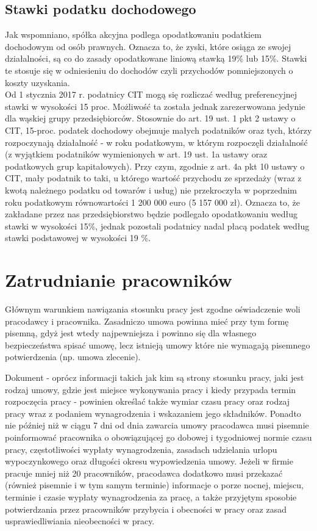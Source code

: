 \documentclass[11pt]{article}
\begin{document}
	\subsection{Stawki podatku dochodowego}
	
	Jak wspomniano, spółka akcyjna podlega opodatkowaniu podatkiem dochodowym od osób prawnych. Oznacza to, że zyski, które osiąga ze swojej działalności, są co do zasady opodatkowane liniową stawką 19\% lub 15\%. Stawki te stosuje się w odniesieniu do dochodów czyli przychodów pomniejszonych o koszty uzyskania.\\
	Od 1 stycznia 2017 r. podatnicy CIT mogą się rozliczać według preferencyjnej stawki w wysokości 15 proc. Możliwość ta została jednak zarezerwowana jedynie dla wąskiej grupy przedsiębiorców. Stosownie do art. 19 ust. 1 pkt 2 ustawy o CIT, 15-proc. podatek dochodowy obejmuje małych podatników oraz tych, którzy rozpoczynają działalność - w roku podatkowym, w którym rozpoczęli działalność (z wyjątkiem podatników wymienionych w art. 19 ust. 1a ustawy oraz podatkowych grup kapitałowych). Przy czym, zgodnie z art. 4a pkt 10 ustawy o CIT, mały podatnik to taki, u którego wartość przychodu ze sprzedaży (wraz z kwotą należnego podatku od towarów i usług) nie przekroczyła w poprzednim roku podatkowym równowartości 1 200 000 euro (5 157 000 zł). Oznacza to, że zakładane przez nas przedsiębiorstwo będzie podlegało opodatkowaniu według stawki w wysokości 15\%, jednak pozostali podatnicy nadal płacą podatek według stawki podstawowej w wysokości 19 \%.
	
	\section{Zatrudnianie pracowników}
	Głównym warunkiem nawiązania stosunku pracy jest zgodne oświadczenie woli pracodawcy i pracownika. Zasadniczo umowa powinna mieć przy tym formę pisemną, gdyż jest wtedy najpewniejsza i powinno się dla własnego bezpieczeństwa spisać umowę, lecz istnieją umowy które nie wymagają pisemnego potwierdzenia (np. umowa zlecenie).
	
	Dokument - oprócz informacji takich jak kim są strony stosunku pracy, jaki jest rodzaj umowy, gdzie jest miejsce wykonywania pracy i kiedy przypada termin rozpoczęcia pracy - powinien określać także wymiar czasu pracy oraz rodzaj pracy wraz z podaniem wynagrodzenia i wskazaniem jego składników.
	Ponadto nie później niż w ciągu 7 dni od dnia zawarcia umowy pracodawca musi pisemnie poinformować pracownika o obowiązującej go dobowej i tygodniowej normie czasu pracy, częstotliwości wypłaty wynagrodzenia, zasadach udzielania urlopu wypoczynkowego oraz długości okresu wypowiedzenia umowy. Jeżeli w firmie pracuje mniej niż 20 pracowników, pracodawca dodatkowo musi przekazać (również pisemnie i w tym samym terminie) informacje o porze nocnej, miejscu, terminie i czasie wypłaty wynagrodzenia za pracę, a także przyjętym sposobie potwierdzania przez pracowników przybycia i obecności w pracy oraz zasad usprawiedliwiania nieobecności w pracy.
	
\end{document}
